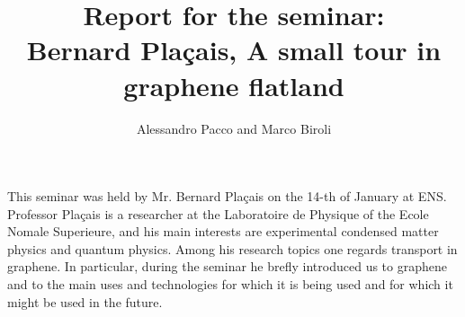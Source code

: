 \documentclass[12pt,a4paper]{article}
\author{Alessandro Pacco and Marco Biroli}
\title{Report for the seminar:\\Bernard Plaçais, A small tour in graphene flatland}
\begin{document}
 
\maketitle


This seminar was held by Mr. Bernard Plaçais on the 14-th of January at ENS.\\

Professor Plaçais is a researcher at the Laboratoire de Physique of the Ecole Nomale Superieure, and his main interests are experimental condensed matter physics and quantum physics. Among his research topics one regards transport in graphene. In particular, during the seminar he brefly introduced us to graphene and to the main uses and technologies for which it is being used and for which it might be used in the future. \\
\end{document}
